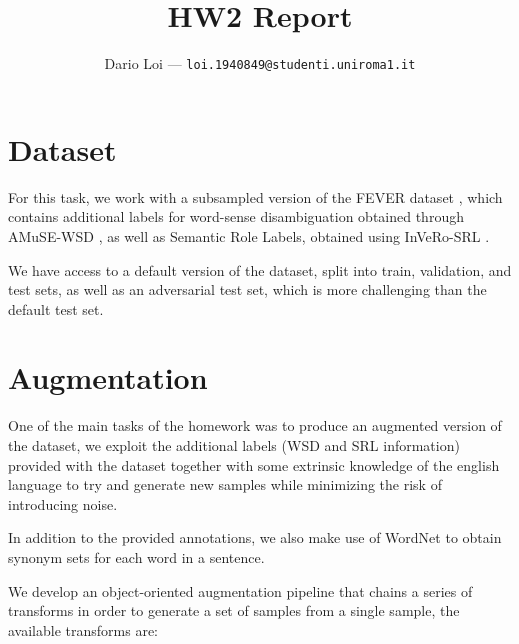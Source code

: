 \documentclass[10pt]{article}
\title{HW2 Report}
\author{Dario Loi ---
  \texttt{loi.1940849@studenti.uniroma1.it} \\}
\begin{document}
\maketitle

\tableofcontents

\section{Dataset}
For this task, we work with a subsampled version of the FEVER dataset \cite{fever}, which contains
additional labels for word-sense disambiguation obtained through AMuSE-WSD \cite{wsd}, as well as
Semantic Role Labels, obtained using InVeRo-SRL \cite{srl}.

We have access to a default version of the dataset, split into train, validation, and test sets, as well as
an adversarial test set, which is more challenging than the default test set.

\section{Augmentation}

One of the main tasks of the homework was to produce an augmented version of the dataset, we exploit
the additional labels (WSD and SRL information) provided with the dataset together with some
extrinsic knowledge of the english language to try and generate new samples while minimizing the
risk of introducing noise.

In addition to the provided annotations, we also make use of WordNet \cite{wordnet} to obtain synonym sets for each word in a sentence.

We develop an object-oriented augmentation pipeline that chains a series of transforms in order to
generate a set of samples from a single sample, the available transforms are:
\end{document}
